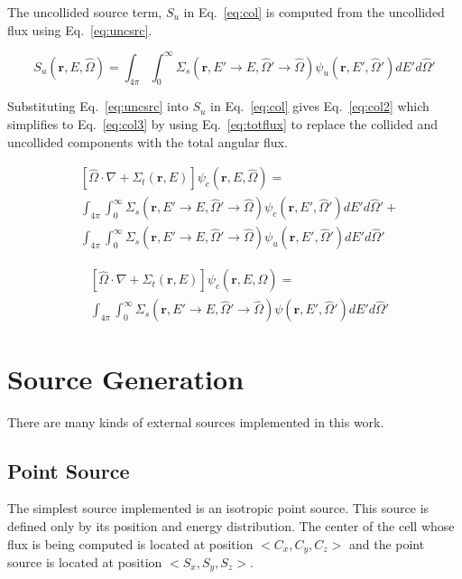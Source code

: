 The uncollided source term, $S_u$ in Eq.~\ref{eq:col} is computed from the uncollided flux using Eq.~\ref{eq:uncsrc}.

\begin{equation} \label{eq:uncsrc}
S_u(\boldsymbol{r}, E, \hat{\Omega}) = \int_{4\pi} \int_{0}^{\infty} 
\Sigma_s(\boldsymbol{r}, E' \rightarrow E, \hat{\Omega}' \rightarrow \hat{\Omega}) \psi_u(\boldsymbol{r}, E', \hat{\Omega}') 
dE' d\hat{\Omega}'
\end{equation}

Substituting Eq.~\ref{eq:uncsrc} into $S_u$ in Eq.~\ref{eq:col} gives Eq.~\ref{eq:col2} which simplifies to Eq.~\ref{eq:col3} by using Eq.~\ref{eq:totflux} to replace the collided and uncollided components with the total angular flux.

\begin{equation} \label{eq:col2}
\begin{split}
	&\left[ \hat{\Omega} \cdot \nabla + \Sigma_t(\boldsymbol{r}, E) \right]
	\psi_c(\boldsymbol{r}, E, \hat{\Omega}) = \\
	&\int_{4 \pi} \int_0^\infty \Sigma_s(\boldsymbol{r}, E' \rightarrow E, \hat{\Omega}' \rightarrow \hat{\Omega}) \psi_c(\boldsymbol{r}, E', \hat{\Omega}') dE' d\hat{\Omega}' + \\
	&\int_{4\pi} \int_{0}^{\infty} 
\Sigma_s(\boldsymbol{r}, E' \rightarrow E, \hat{\Omega}' \rightarrow \hat{\Omega}) \psi_u(\boldsymbol{r}, E', \hat{\Omega}') 
dE' d\hat{\Omega}'
\end{split}
\end{equation}

\begin{equation} \label{eq:col3}
\begin{split}
	&\left[ \hat{\Omega} \cdot \nabla + \Sigma_t(\boldsymbol{r}, E) \right]
	\psi_c(\boldsymbol{r}, E, \hat{\Omega}) = \\
	&\int_{4 \pi} \int_0^\infty \Sigma_s(\boldsymbol{r}, E' \rightarrow E, \hat{\Omega}' \rightarrow \hat{\Omega}) \psi(\boldsymbol{r}, E', \hat{\Omega}') dE' d\hat{\Omega}'
\end{split}
\end{equation}

\section{Source Generation}
There are many kinds of external sources implemented in this work.

\subsection{Point Source}
The simplest source implemented is an isotropic point source. This source is defined only by its position and energy distribution. The center of the cell whose flux is being computed is located at position $<C_x, C_y, C_z>$ and the point source is located at position $<S_x, S_y, S_z>$.

